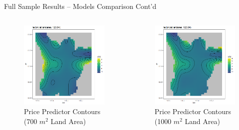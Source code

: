 \documentclass{beamer}
\begin{document}
\begin{frame}[t]{Full Sample Results -- Models Comparison Cont'd}
\begin{columns}[onlytextwidth]
\begin{figure}
\caption{Price Predictor Contours (700 $m^2$ Land Area)}
\includegraphics[scale=0.3]{spline_700m2}
\end{figure}
\begin{figure}
\caption{Price Predictor Contours (1000 $m^2$ Land Area)}
\includegraphics[scale=0.3]{spline_1000m2}
\end{figure}
\end{columns}
\end{frame}
\end{document}
